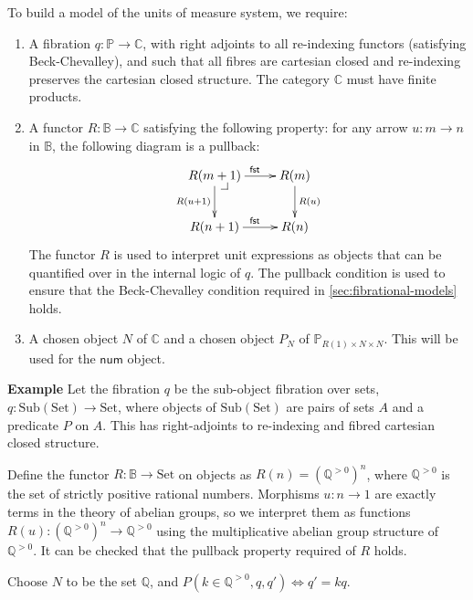 \documentclass{article}
\makeatletter
\newcommand{\cat}[1]{\mathbb{#1}}
\newcommand{\Set}{\mathrm{Set}}
\newcommand{\Sub}{\mathrm{Sub}}
\newenvironment{example}{\noindent\textbf{Example}}{\medskip}
\newcommand{\pullbackcorner}[1][dr]{\save*!/#1-1.2pc/#1:(-1,1)@^{|-}\restore}
\makeatother
\begin{document}
To build a model of the units of measure system, we require:
\begin{enumerate}
\item A fibration $q : \cat{P} \to \cat{C}$, with right adjoints to
  all re-indexing functors (satisfying Beck-Chevalley), and such that
  all fibres are cartesian closed and re-indexing preserves the
  cartesian closed structure. The category $\cat{C}$ must have finite
  products.
\item A functor $R : \cat{B} \to \cat{C}$ satisfying the following
  property: for any arrow $u : m \to n$ in $\cat{B}$, the following
  diagram is a pullback:
  \begin{displaymath}
    \xymatrix{
      {R(m + 1)} \ar[r]^{\mathsf{fst}} \ar[d]_{R(u + 1)} \pullbackcorner & {R(m)} \ar[d]^{R(u)} \\
      {R(n + 1)} \ar[r]^{\mathsf{fst}} & {R(n)}
    }
  \end{displaymath}
  The functor $R$ is used to interpret unit expressions as objects
  that can be quantified over in the internal logic of $q$. The
  pullback condition is used to ensure that the Beck-Chevalley
  condition required in \autoref{sec:fibrational-models} holds.
\item A chosen object $N$ of $\cat{C}$ and a chosen object $P_N$ of
  $\cat{P}_{R(1) \times N \times N}$. This will be used for the
  $\mathsf{num}$ object.
\end{enumerate}

\begin{example}
  Let the fibration $q$ be the sub-object fibration over sets, $q :
  \Sub(\Set) \to \Set$, where objects of $\Sub(\Set)$ are pairs of
  sets $A$ and a predicate $P$ on $A$. This has right-adjoints to
  re-indexing and fibred cartesian closed structure.

  Define the functor $R : \cat{B} \to \Set$ on objects as $R(n) =
  (\mathbb{Q}^{>0})^n$, where $\mathbb{Q}^{>0}$ is the set of strictly
  positive rational numbers. Morphisms $u : n \to 1$ are exactly terms
  in the theory of abelian groups, so we interpret them as functions
  $R(u) : (\mathbb{Q}^{>0})^n \to \mathbb{Q}^{>0}$ using the
  multiplicative abelian group structure of $\mathbb{Q}^{>0}$. It can
  be checked that the pullback property required of $R$ holds.

  Choose $N$ to be the set $\mathbb{Q}$, and $P(k \in \mathbb{Q}^{>0},
  q, q') \Leftrightarrow q' = kq$.
\end{example}
\end{document}
